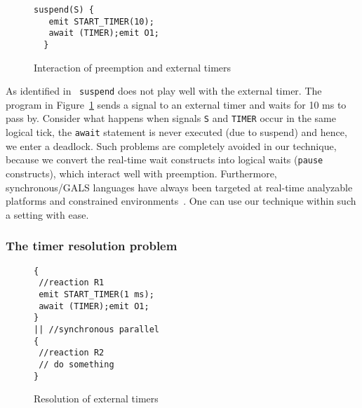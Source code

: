 \begin{figure}[h!]
  \centering
	\vspace{-10pt}
		\begin{lstlisting}[style=sysj,basicstyle=\footnotesize\ttfamily,morekeywords={emit,trap,pause,exit,delay,suspend}]
  suspend(S) {
   emit START_TIMER(10); 
   await (TIMER);emit O1;
  }
		\end{lstlisting}
  \caption{Interaction of preemption and external timers}
  \label{fig:preemp}
	\vspace{-10pt}
\end{figure}

As identified in~\cite{Bourke2009a} \texttt{suspend} does not play well
with the external timer. The program in Figure~\ref{fig:preemp} sends a
signal to an external timer and waits for 10 ms to pass by. Consider
what happens when signals \texttt{S} and \texttt{TIMER} occur in the
same logical tick, the \texttt{await} statement is never executed (due
to suspend) and hence, we enter a deadlock. Such problems are completely
avoided in our technique, because we convert the real-time wait
constructs into logical waits (\texttt{pause} constructs), which
interact well with preemption.  Furthermore, synchronous/GALS languages
have always been targeted at real-time analyzable platforms and
constrained
environments~\cite{DBLP:journals/pieee/SifakisTY03,boldt07}. One can use
our technique within such a setting with ease.

\subsubsection{The timer resolution problem}
\label{sec:resolution-real-time}

\begin{figure}[h!]
  \centering
	\vspace{-10pt}
		\begin{lstlisting}[style=sysj,basicstyle=\footnotesize\ttfamily,morekeywords={emit,trap,pause,exit,delay,suspend}]
{
 //reaction R1
 emit START_TIMER(1 ms); 
 await (TIMER);emit O1;
}
|| //synchronous parallel
{
 //reaction R2
 // do something
}
		\end{lstlisting}
  \caption{Resolution of external timers}
  \label{fig:resolution}
	\vspace{-10pt}
\end{figure}


